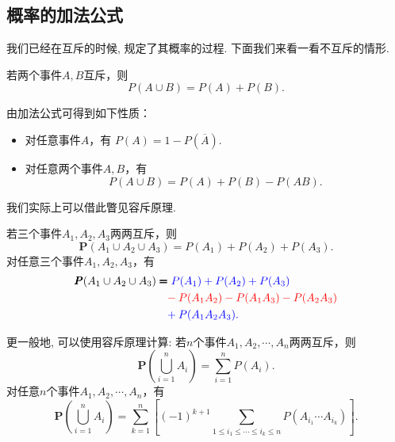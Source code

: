 
\subsection{概率的加法公式}
我们已经在互斥的时候, 规定了其概率的过程. 下面我们来看一看不互斥的情形. 
\begin{proposition}[加法公式]
    若两个事件$A,B$互斥，则
    $$P(A\cup B)=P(A)+P(B).$$
\end{proposition}

\begin{remark}
    由加法公式可得到如下性质：
    \begin{itemize}
        \item 对任意事件$A$，有
              $P(A)=1-P\left(\overline{A}\right).$
        \item 对任意两个事件$A,B$，有
              $$P(A\cup B)=P(A)+P(B)-P(AB).$$
    \end{itemize}
\end{remark}

\begin{asidebox}
    我们实际上可以借此瞥见容斥原理. 
\begin{remark}
    若三个事件$A_1, A_2, A_3$两两互斥，则
    $$\pmb P(A_1 \cup A_2 \cup A_3) = P(A_1)+P(A_2)+P(A_3).$$
    对任意三个事件$A_1, A_2, A_3$，有
    \begin{align*}
        \pmb P(A_1 \cup A_2 \cup A_3) & \pmb=\color{blue}P(A_1)+P(A_2)+P(A_3)              \\
                                      & \phantom=\color{red}-P(A_1A_2)-P(A_1A_3)-P(A_2A_3) \\
                                      & \phantom=\color{blue}+P(A_1A_2A_3).
    \end{align*}%
\end{remark}

\begin{remark}
    更一般地, 可以使用容斥原理计算: 
    若$n$个事件$A_1, A_2, \cdots, A_n$两两互斥，则
    $$\pmb P\left( \bigcup_{i=1}^n A_i \right)=\sum_{i=1}^n P(A_i).$$
    \vspace{0.2in}
    对任意$n$个事件$A_1, A_2, \cdots, A_n$，有
    $$\pmb P\left( \bigcup_{i=1}^n A_i \right)=\sum_{k=1}^n \left[ (-1)^{k+1} \sum_{1\le i_1\le \cdots\le i_k \le n} P(A_{i_1}\cdots A_{i_k}) \right].$$
\end{remark}


\end{asidebox}

